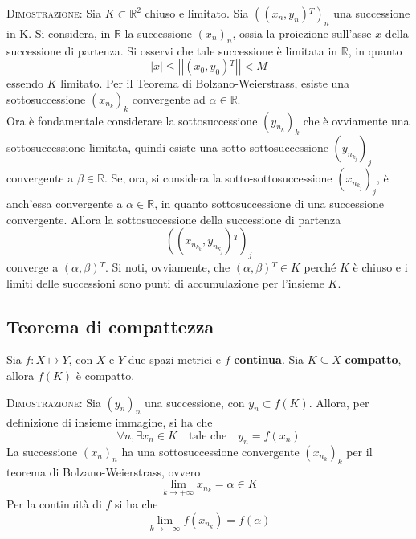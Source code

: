 \documentclass[a4paper]{extarticle}
\begin{document}
\vspace{2em}
\noindent
\normalfont \normalsize
\textsc{Dimostrazione}: Sia $K \subset \mathbb{R}^2$ chiuso e limitato. Sia $\left((x_n,y_n){^T}\right)_n$ una successione in K. Si considera, in $\mathbb{R}$ la successione $(x_n)_n$, ossia la proiezione sull'asse $x$ della successione di partenza. Si osservi che tale successione è limitata in $\mathbb{R}$, in quanto
\[\left \vert x \right \vert \leq \left \vert \left \vert (x_0,y_0){^T} \right \vert \right \vert < M\]
essendo $K$ limitato. Per il Teorema di Bolzano-Weierstrass, esiste una sottosuccessione $(x_{n_k})_k$ convergente ad $\alpha \in \mathbb{R}$.\\
Ora è fondamentale considerare la sottosuccessione $(y_{n_k})_k$ che è ovviamente una sottosuccessione limitata, quindi esiste una sotto-sottosuccessione $(y_{n_{k_j}})_j$ convergente a $\beta \in \mathbb{R}$. Se, ora, si considera la sotto-sottosuccessione $(x_{n_{k_j}})_j$, è anch'essa convergente a $\alpha \in \mathbb{R}$, in quanto sottosuccessione di una successione convergente. Allora la sottosuccessione della successione di partenza
\[\left((x_{n_{k_k}}, y_{n_{k_j}}){^T}\right)_j\]
converge a $(\alpha,\beta){^T}$. Si noti, ovviamente, che $(\alpha,\beta){^T} \in K$ perché $K$ è chiuso e i limiti delle successioni sono punti di accumulazione per l'insieme $K$.

\vspace{1em}
\noindent
\subsection{Teorema di compattezza}
Sia $f : X \longmapsto Y$, con $X$ e $Y$ due spazi metrici e $f$ \textbf{continua}. Sia $K \subseteq X$ \textbf{compatto}, allora $f(K)$ è compatto.

\vspace{2em}
\noindent
\normalfont \normalsize
\textsc{Dimostrazione}: Sia $(y_n)_n$ una successione, con $y_n \subset f(K)$. Allora, per definizione di insieme immagine, si ha che
\[\forall n, \exists x_n \in K \hspace{1em} \text{tale che} \hspace{1em} y_n=f(x_n)\]
La successione $(x_n)_n$ ha una sottosuccessione convergente $(x_{n_k})_k$ per il teorema di Bolzano-Weierstrass, ovvero
\[\lim_{k \to +\infty} x_{n_k} = \alpha \in K\]
Per la continuità di $f$ si ha che
\[\lim_{k \to +\infty} f(x_{n_k}) = f(\alpha)\]
\end{document}
